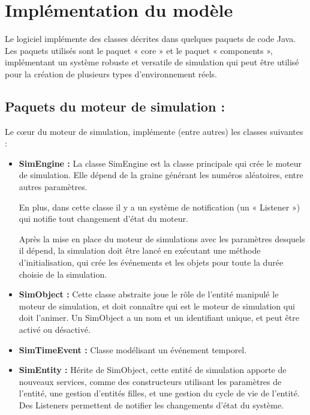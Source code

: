 \documentclass[12pt]{article} %
\begin{document}
\newpage
\section{Implémentation du modèle}\label{implementation}
Le logiciel implémente des classes décrites dans quelques paquets de code Java. Les paquets utilisés sont le paquet « core » et le paquet « components », implémentant un système robuste et versatile de simulation qui peut être utilisé pour la création de plusieurs types d’environnement réels.

\subsection{Paquets du moteur de simulation :}
Le cœur du moteur de simulation, implémente (entre autres) les classes suivantes :

\begin{itemize}
\item \textbf{SimEngine :}
La classe SimEngine est la classe principale qui crée le moteur de simulation. Elle dépend de la graine générant les numéros aléatoires, entre autres paramètres.

En plus, dans cette classe il y a un système de notification (un « Listener ») qui notifie tout changement d'état du moteur. 

Après la mise en place du moteur de simulations avec les paramètres desquels il dépend, la simulation doit être lancé en exécutant une méthode d'initialisation, qui crée les événements et les objets pour toute la durée choisie de la simulation.

\item \textbf{SimObject :} Cette classe abstraite joue le rôle de l’entité manipulé le moteur de simulation, et doit connaître qui est le moteur de simulation qui doit l'animer.
Un SimObject a un nom et un identifiant unique, et peut être activé ou désactivé.\\

\item \textbf{SimTimeEvent :} Classe modélisant un événement temporel.\\

\item \textbf{SimEntity :} Hérite de SimObject, cette entité de simulation apporte de nouveaux services, comme des constructeurs utilisant les paramètres de l’entité, une gestion d’entités filles, et une gestion du cycle de vie de l’entité. Des Listeners permettent de notifier les changements d’état du système.
\end{itemize} 
\end{document}
